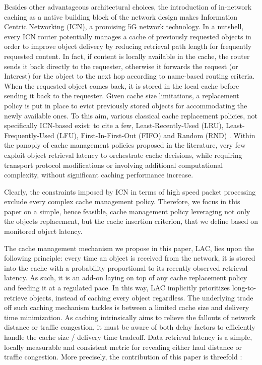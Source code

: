 \documentclass[conference]{IEEEtran}
\begin{document}
Besides other advantageous architectural choices, the 
introduction of in-network caching as a native building block 
of the network design makes Information Centric Networking 
(ICN)\cite{Jacobson:2009:NNC:1658939.1658941}, a promising 5G 
network technology.
In a nutshell, every ICN router potentially manages a cache 
of previously requested objects in order to improve object 
delivery by reducing retrieval path length for frequently 
requested content. In fact, if content is locally available 
in the cache, the router sends it back directly to the 
requester, otherwise it forwards the request (or Interest) 
for the object to the next hop according to name-based 
routing criteria. When the requested object comes back, it is 
stored in the local cache before sending it back to the 
requester. Given cache size limitations, a replacement policy 
is put in place to evict previously stored objects for 
accommodating the newly available ones. To this aim, various 
classical cache replacement policies, not specifically 
ICN-based exist: to cite a few, Least-Recently-Used (LRU), 
Least-Frequently-Used (LFU), First-In-First-Out (FIFO) and 
Random (RND) \cite{DBLP:journals/corr/abs-1202-4880}.
Within the panoply of cache management policies proposed in 
the literature, very few exploit object retrieval latency to 
orchestrate cache decisions, while requiring transport 
protocol modifications \cite{Prob-Cache} or involving 
additional computational 
complexity\cite{Tong:2013:LSS:2505515.2507857}, without 
significant caching performance increase.

Clearly, the constraints imposed by ICN in terms of high 
speed packet processing exclude every complex cache 
management policy. Therefore, we focus in this paper on a 
simple, hence feasible, cache management policy leveraging
not only the objects replacement, but the cache insertion 
criterion,  that we define based on monitored object latency.

The cache management mechanism we propose in this paper, LAC, 
lies upon the following principle: every time an object is 
received from the network, it is stored into the cache with a 
probability proportional to its recently observed retrieval 
latency. As such, it is an add-on laying on top of any cache 
replacement policy and feeding it at a regulated pace. 
In this way, LAC implicitly prioritizes long-to-retrieve 
objects, instead of caching every object regardless. 
The underlying trade off such caching mechanism tackles is 
between a limited cache size and delivery time minimization.
As caching intrinsically aims to relieve the fallouts of 
network distance or traffic congestion, it must be aware of 
both delay factors to efficiently handle the cache size / 
delivery time tradeoff.  Data retrieval latency is a simple, 
locally measurable and consistent metric for revealing either 
haul distance or traffic congestion.
More precisely, the contribution of this paper is threefold :
\end{document}
